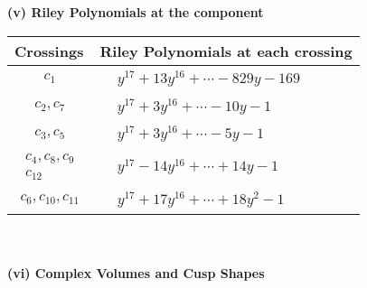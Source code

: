 \documentclass[1p]{elsarticle_modified}
\theoremstyle{definition}
\begin{document}
\flushleft \textbf{(v) Riley Polynomials at the component}\newline \\
\begin{tabular}{m{50pt}|m{274pt}}
Crossings & \hspace{64pt}Riley Polynomials at each crossing \\
\hline $$\begin{aligned}c_{1}\end{aligned}$$&$\begin{aligned}
&y^{17}+13 y^{16}+\cdots-829 y-169
\end{aligned}$\\
\hline $$\begin{aligned}c_{2},c_{7}\end{aligned}$$&$\begin{aligned}
&y^{17}+3 y^{16}+\cdots-10 y-1
\end{aligned}$\\
\hline $$\begin{aligned}c_{3},c_{5}\end{aligned}$$&$\begin{aligned}
&y^{17}+3 y^{16}+\cdots-5 y-1
\end{aligned}$\\
\hline $$\begin{aligned}c_{4},c_{8},c_{9}\\c_{12}\end{aligned}$$&$\begin{aligned}
&y^{17}-14 y^{16}+\cdots+14 y-1
\end{aligned}$\\
\hline $$\begin{aligned}c_{6},c_{10},c_{11}\end{aligned}$$&$\begin{aligned}
&y^{17}+17 y^{16}+\cdots+18 y^2-1
\end{aligned}$\\
\hline
\end{tabular}\\~\\
\newpage\flushleft \textbf{(vi) Complex Volumes and Cusp Shapes}
\end{document}
